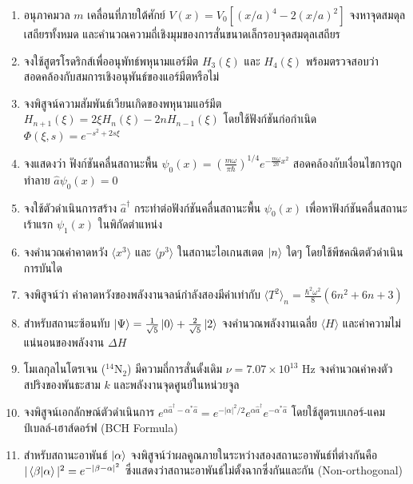 \begin{enumerate}
    \item อนุภาคมวล $m$ เคลื่อนที่ภายใต้ศักย์ $V(x) = V_0 \left[ (x/a)^4 - 2(x/a)^2 \right]$ จงหาจุดสมดุลเสถียรทั้งหมด และคำนวณความถี่เชิงมุมของการสั่นขนาดเล็กรอบจุดสมดุลเสถียร
    
    \item จงใช้สูตรโรดริกส์เพื่ออนุพัทธ์พหุนามแอร์มีต $H_3(\xi)$ และ $H_4(\xi)$ พร้อมตรวจสอบว่าสอดคล้องกับสมการเชิงอนุพันธ์ของแอร์มีตหรือไม่
    
    \item จงพิสูจน์ความสัมพันธ์เวียนเกิดของพหุนามแอร์มีต $H_{n+1}(\xi) = 2\xi H_n(\xi) - 2n H_{n-1}(\xi)$ โดยใช้ฟังก์ชันก่อกำเนิด $\Phi(\xi, s) = e^{-s^2 + 2s\xi}$
    
    \item จงแสดงว่า ฟังก์ชันคลื่นสถานะพื้น $\psi_0(x) = \left( \frac{m\omega}{\pi\hbar} \right)^{1/4} e^{-\frac{m\omega}{2\hbar}x^2}$ สอดคล้องกับเงื่อนไขการถูกทำลาย $\hat{a}\psi_0(x) = 0$
    
    \item จงใช้ตัวดำเนินการสร้าง $\hat{a}^\dagger$ กระทำต่อฟังก์ชันคลื่นสถานะพื้น $\psi_0(x)$ เพื่อหาฟังก์ชันคลื่นสถานะเร้าแรก $\psi_1(x)$ ในพิกัดตำแหน่ง
    
    \item จงคำนวณค่าคาดหวัง $\langle x^3 \rangle$ และ $\langle p^3 \rangle$ ในสถานะไอเกนสเตต $\ket{n}$ ใดๆ โดยใช้พีชคณิตตัวดำเนินการบันได
    
    \item จงพิสูจน์ว่า ค่าคาดหวังของพลังงานจลน์กำลังสองมีค่าเท่ากับ $\langle T^2 \rangle_n = \frac{\hbar^2\omega^2}{8}(6n^2 + 6n + 3)$
    
    \item สำหรับสถานะซ้อนทับ $\ket{\Psi} = \frac{1}{\sqrt{5}}\ket{0} + \frac{2}{\sqrt{5}}\ket{2}$ จงคำนวณพลังงานเฉลี่ย $\langle H \rangle$ และค่าความไม่แน่นอนของพลังงาน $\Delta H$
    
    \item โมเลกุลไนโตรเจน ($^{14}\text{N}_2$) มีความถี่การสั่นดั้งเดิม $\nu = 7.07 \times 10^{13}\text{ Hz}$ จงคำนวณค่าคงตัวสปริงของพันธะสาม $k$ และพลังงานจุดศูนย์ในหน่วยจูล
    
    \item จงพิสูจน์เอกลักษณ์ตัวดำเนินการ $e^{\alpha \hat{a}^\dagger - \alpha^* \hat{a}} = e^{-|\alpha|^2/2} e^{\alpha \hat{a}^\dagger} e^{-\alpha^* \hat{a}}$ โดยใช้สูตรเบเกอร์-แคมป์เบลล์-เฮาส์ดอร์ฟ (BCH Formula)
    
    \item สำหรับสถานะอาพันธ์ $\ket{\alpha}$ จงพิสูจน์ว่าผลคูณภายในระหว่างสองสถานะอาพันธ์ที่ต่างกันคือ $|\braket{\beta}{\alpha}|^2 = e^{-|\beta - \alpha|^2}$ ซึ่งแสดงว่าสถานะอาพันธ์ไม่ตั้งฉากซึ่งกันและกัน (Non-orthogonal)
    

\end{enumerate}
